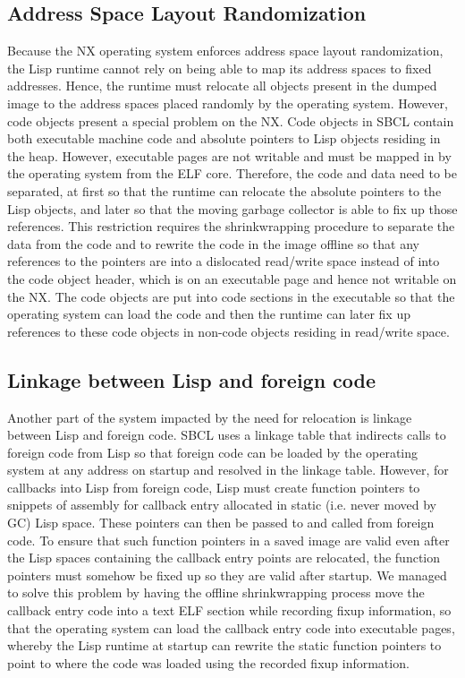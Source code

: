 \documentclass[format=sigconf]{acmart}
\begin{document}
\subsection{Address Space Layout Randomization}
Because the NX operating system enforces address space layout randomization, the Lisp runtime cannot rely on being able to map its address spaces to fixed addresses. Hence, the runtime must relocate all objects present in the dumped image to the address spaces placed randomly by the operating system. However, code objects present a special problem on the NX. Code objects in SBCL contain both executable machine code and absolute pointers to Lisp objects residing in the heap. However, executable pages are not writable and must be mapped in by the operating system from the ELF core. Therefore, the code and data need to be separated, at first so that the runtime can relocate the absolute pointers to the Lisp objects, and later so that the moving garbage collector is able to fix up those references. This restriction requires the shrinkwrapping procedure to separate the data from the code and to rewrite the code in the image offline so that any references to the pointers are into a dislocated read/write space instead of into the code object header, which is on an executable page and hence not writable on the NX. The code objects are put into code sections in the executable so that the operating system can load the code and then the runtime can later fix up references to these code objects in non-code objects residing in read/write space.

\subsection{Linkage between Lisp and foreign code}
Another part of the system impacted by the need for relocation is linkage between Lisp and foreign code. SBCL uses a linkage table that indirects calls to foreign code from Lisp so that foreign code can be loaded by the operating system at any address on startup and resolved in the linkage table. However, for callbacks into Lisp from foreign code, Lisp must create function pointers to snippets of assembly for callback entry allocated in static (i.e. never moved by GC) Lisp space. These pointers can then be passed to and called from foreign code. To ensure that such function pointers in a saved image are valid even after the Lisp spaces containing the callback entry points are relocated, the function pointers must somehow be fixed up so they are valid after startup. We managed to solve this problem by having the offline shrinkwrapping process move the callback entry code into a text ELF section while recording fixup information, so that the operating system can load the callback entry code into executable pages, whereby the Lisp runtime at startup can rewrite the static function pointers to point to where the code was loaded using the recorded fixup information.
\end{document}
